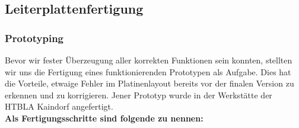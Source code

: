 \newpage
\subsection{Leiterplattenfertigung}

\subsubsection{Prototyping}

Bevor wir fester Überzeugung aller korrekten Funktionen sein konnten, stellten wir uns die Fertigung eines funktionierenden Prototypen als Aufgabe.
Dies hat die Vorteile, etwaige Fehler im Platinenlayout bereits vor der finalen Version zu erkennen und zu korrigieren.
Jener Prototyp wurde in der Werkstätte der \acs{HTBLA} Kaindorf angefertigt. \\

\textbf{Als Fertigungsschritte sind folgende zu nennen:}

